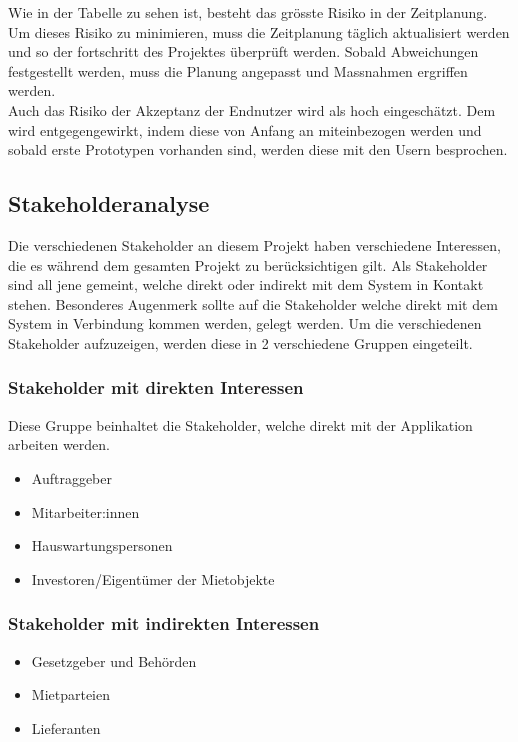Wie in der Tabelle zu sehen ist, besteht das grösste Risiko in der Zeitplanung. Um dieses Risiko zu minimieren, muss die Zeitplanung täglich aktualisiert werden und so der fortschritt des Projektes überprüft werden. Sobald Abweichungen festgestellt werden, muss die Planung angepasst und Massnahmen ergriffen werden. \\
Auch das Risiko der Akzeptanz der Endnutzer wird als hoch eingeschätzt. Dem wird entgegengewirkt, indem diese von Anfang an miteinbezogen werden und sobald erste Prototypen vorhanden sind, werden diese mit den Usern besprochen.

\subsection{Stakeholderanalyse}
Die verschiedenen Stakeholder an diesem Projekt haben verschiedene Interessen, die es während dem gesamten Projekt zu berücksichtigen gilt. Als Stakeholder sind all jene gemeint, welche direkt oder indirekt mit dem System in Kontakt stehen. Besonderes Augenmerk sollte auf die Stakeholder welche direkt mit dem System in Verbindung kommen werden, gelegt werden.
Um die verschiedenen Stakeholder aufzuzeigen, werden diese in 2 verschiedene Gruppen eingeteilt.

\subsubsection{Stakeholder mit direkten Interessen}
Diese Gruppe beinhaltet die Stakeholder, welche direkt mit der Applikation arbeiten werden.

\begin{itemize}
  \item Auftraggeber
  \item Mitarbeiter:innen
  \item Hauswartungspersonen
  \item Investoren/Eigentümer der Mietobjekte
\end{itemize}

\subsubsection{Stakeholder mit indirekten Interessen}

\begin{itemize}
  \item Gesetzgeber und Behörden
  \item Mietparteien
  \item Lieferanten
\end{itemize}


